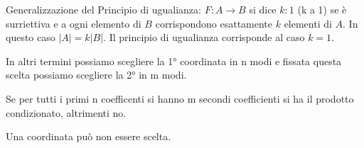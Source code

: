 Generalizzazione del Principio di ugualianza: $F:A\to B$ si dice $k:1$ (k a 1) se è surriettiva e a ogni elemento di $B$ corrispondono esattamente $k$ elementi di $A$. In questo caso $|A|=k|B|$. Il principio di ugualianza corrisponde al caso $k=1$.


In altri termini possiamo scegliere la 1° coordinata in n modi e fissata questa scelta possiamo scegliere la 2° in m modi.

Se per tutti i primi n coefficenti si hanno m secondi coefficienti si ha il prodotto condizionato, altrimenti no.

Una coordinata può non essere scelta.

